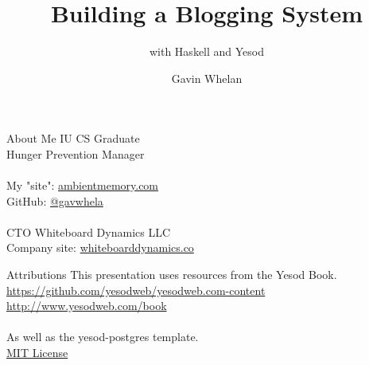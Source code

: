 \documentclass[pdf]{beamer}
\title{Building a Blogging System}
\subtitle{with Haskell and Yesod}
\author{Gavin Whelan}
\begin{document}
\begin{frame}
  \titlepage
\end{frame}

\begin{frame}{About Me}
  IU CS Graduate\\
  Hunger Prevention Manager\\
  \\
  My "site": \href{https://ambientmemory.com}{ambientmemory.com}\\
  GitHub: \href{https://github.com/gavwhela}{@gavwhela}\\
  \\
  CTO Whiteboard Dynamics LLC\\
  Company site: \href{https://whiteboarddynamics.co}{whiteboarddynamics.co}\\
\end{frame}

\begin{frame}{Attributions}
  This presentation uses resources from the Yesod Book.\\
  \url{https://github.com/yesodweb/yesodweb.com-content}\\
  \url{http://www.yesodweb.com/book}\\
  \\
  As well as the yesod-postgres template.\\
  \href{https://github.com/commercialhaskell/stack-templates/blob/master/LICENSE}{MIT License}\\
\end{frame}
\end{document}
